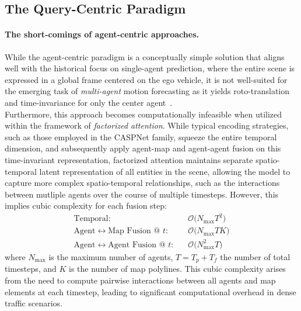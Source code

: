 
\subsection{The Query-Centric Paradigm}
\label{ssec:qc_paradigm}

\paragraph{The short-comings of agent-centric approaches.}

While the agent-centric paradigm is a conceptually simple solution that aligns well with the historical focus on single-agent prediction, where the entire scene is expressed in a global frame centered on the ego vehicle, it is not well-suited for the emerging task of \emph{multi-agent} motion forecasting as it yields roto-translation and time-invariance for only the center agent~\cite{lmformerYadav2025}. \\
Furthermore, this approach becomes computationally infeasible when utilized within the framework of \emph{factorized attention}. While typical encoding strategies, such as those employed in the CASPNet family, squeeze the entire temporal dimension, and subsequently apply agent-map and agent-agent fusion on this time-invariant representation, factorized attention maintains separate spatio-temporal latent representation of all entities in the scene, allowing the model to capture more complex spatio-temporal relationships, such as the interactions between mutliple agents over the course of multiple timesteps. However, this implies cubic complexity for each fusion step:
\begin{equation}
  \begin{aligned}
    \text{Temporal:}      & \quad \mathcal{O}\!\bigl(N_{\max}T^{2}\bigr) \\
    \text{Agent\(\leftrightarrow\)Map Fusion @ $t$:}    & \quad \mathcal{O}\!\bigl(N_{\max}T K\bigr)  \\
    \text{Agent\(\leftrightarrow\)Agent Fusion @ $t$:}  & \quad \mathcal{O}\!\bigl(N_{\max}^{2}T\bigr)
  \end{aligned}
\end{equation}
where \(N_{\max}\) is the maximum number of agents, \(T = T_p + T_f\) the number of total timesteps, and \(K\) is the number of map polylines. This cubic complexity arises from the need to compute pairwise interactions between all agents and map elements at each timestep, leading to significant computational overhead in dense traffic scenarios. \\

